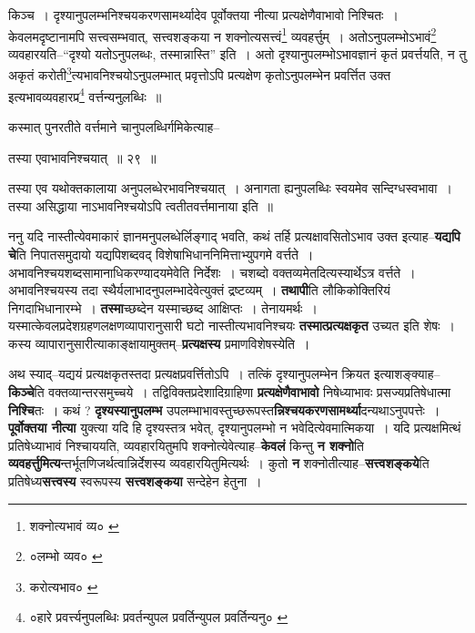 \documentclass[article,12pt,a4paper]{memoir}
\begin{document}
	  \pstart किञ्च । दृश्यानुपलम्भनिश्चयकरणसामर्थ्यादेव पूर्वोक्तया नीत्या प्रत्यक्षेणैवाभावो निश्चितः । केवलमदृष्टानामपि सत्त्वसम्भवात्, सत्त्वशङ्कया न शक्नोत्यसत्त्वं\footnote{शक्नोत्यभावं व्य० \cite{dp-msC}} व्यवहर्त्तुम् । अतोऽनुपलम्भोऽभावं\footnote{०लम्भो व्यव० \cite{dp-msA}} व्यवहारयति--“दृश्यो यतोऽनुपलब्धः, तस्मान्नास्ति” इति । अतो दृश्यानुपलम्भोऽभावज्ञानं कृतं प्रवर्त्तयति, न तु अकृतं करोती\footnote{करोत्यभाव० \cite{dp-msC}}\-त्यभावनिश्चयोऽनुपलम्भात् प्रवृत्तोऽपि प्रत्यक्षेण कृतोऽनुपलम्भेन प्रवर्त्तित उक्त इत्यभावव्यवहारप्र\footnote{०हारे प्रवर्त्त्यनुपलब्धिः \cite{dp-msC} प्रवर्तन्युपल \cite{dp-msA} प्रवर्तिन्युपल \cite{dp-edP} \cite{dp-edH} प्रवर्तिन्यनु० \cite{dp-msB}} वर्त्तन्यनुलब्धिः ॥
	\pend
       

	  \pstart कस्मात् पुनरतीते वर्त्तमाने चानुपलब्धिर्गमिकेत्याह--
	\pend
       
	  \bigskip
	  \begingroup
	

	  \pstart तस्या एवाभावनिश्चयात् ॥ २९ ॥
	\pend
      
	  \endgroup
	 

	  \pstart तस्या एव यथोक्तकालाया अनुपलब्धेरभावनिश्चयात् । अनागता ह्यनुपलब्धिः स्वयमेव सन्दिग्धस्वभावा । तस्या असिद्धाया नाऽभावनिश्चयोऽपि त्वतीतवर्त्तमानाया इति ॥
	\pend
      
	  \endgroup
	

	  \pstart ननु यदि नास्तीत्येवमाकारं ज्ञानमनुपलब्धेर्लिङ्गाद् भवति, कथं तर्हि प्रत्यक्षावसितोऽभाव उक्त इत्याह--\textbf{यद्यपि चे}ति निपातसमुदायो यद्यपिशब्दवद् विशेषाभिधाननिमित्ताभ्युपगमे वर्त्तते । अभावनिश्चयशब्दसामानाधिकरण्यादयमेवेति निर्देशः । चशब्दो वक्तव्यमेतदित्यस्यार्थेऽत्र वर्त्तते । अभावनिश्चयस्य तदा स्थैर्यलाभादनुपलम्भादेवेत्युक्तं द्रष्टव्यम् । \textbf{तथापी}ति लौकिकोक्तिरियं निगदाभिधानारम्भे । \textbf{तस्मा}च्छब्देन यस्माच्छब्द आक्षिप्तः । तेनायमर्थः । यस्मात्केवलप्रदेशग्रहणलक्षणव्यापारानुसारी घटो नास्तीत्यभावनिश्चयः \textbf{तस्मात्प्रत्यक्षकृत} उच्यत इति शेषः । कस्य व्यापारानुसारीत्याकाङ्क्षायामुक्तम्--\textbf{प्रत्यक्षस्य} प्रमाणविशेषस्येति ।
	\pend
      

	  \pstart अथ स्याद्--यद्ययं प्रत्यक्षकृतस्तदा प्रत्यक्षप्रवर्त्तितोऽपि । तत्किं दृश्यानुपलम्भेन क्रियत इत्याशङ्क्याह--\textbf{किञ्चे}ति वक्तव्यान्तरसमुच्चये । तद्विविक्तप्रदेशादिग्राहिणा \textbf{प्रत्यक्षेणैवाभावो} निषेध्याभावः प्रसज्यप्रतिषेधात्मा \textbf{निश्चि}तः । कथं ? \textbf{दृश्यस्यानुपलम्भ} उपलम्भाभावस्तुच्छरूपस्त\textbf{न्निश्चयकरणसामर्थ्या}दन्यथाऽनुपपत्तेः । \textbf{पूर्वोक्तया नीत्या} युक्त्या यदि हि दृश्यस्तत्र भवेत्, दृश्यानुपलम्भो न भवेदित्येवमात्मिकया । यदि प्रत्यक्षमित्थं प्रतिषेध्याभावं निश्चाययति, व्यवहारयितुमपि शक्नोत्येवेत्याह--\textbf{केवलं} किन्तु \textbf{न शक्नो}ति \textbf{व्यवहर्त्तुमित्य}न्तर्भूतणिजर्थत्वान्निर्देशस्य व्यवहारयितुमित्यर्थः । कुतो \textbf{न} शक्नोतीत्याह--\textbf{सत्त्वशङ्कये}ति प्रतिषेध्य\textbf{सत्त्वस्य} स्वरूपस्य \textbf{सत्त्वशङ्कया} सन्देहेन हेतुना ।
	\pend
      
\end{document}
